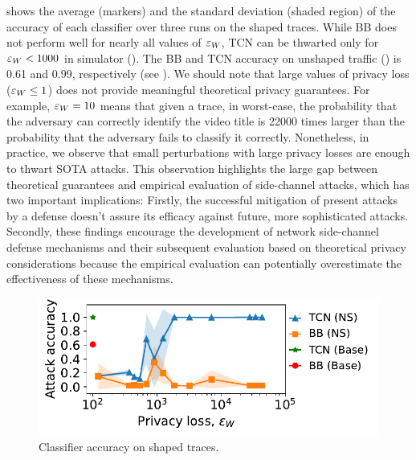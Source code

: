  shows the average (markers) and the standard deviation (shaded region) of the accuracy of each classifier over three runs on the shaped traces.
While BB does not perform well for nearly all values of $\varepsilon_{W}$, TCN can be thwarted only for $\varepsilon_{W} < 1000$ in {\sys} simulator (\ns).
The BB and TCN accuracy on unshaped traffic ({\base}) is 0.61 and 0.99, respectively (see ).
We should note that large values of privacy loss (\ie $\varepsilon_{W} \leq 1$) does not provide meaningful theoretical privacy guarantees.
For example, $\varepsilon_{W}=10$ means that given a trace, in worst-case, the probability that the adversary can correctly identify the video title is 22000 times larger than the probability that the adversary fails to classify it correctly.
Nonetheless, in practice, we observe that small perturbations with large privacy losses are enough to thwart SOTA attacks.
This observation highlights the large gap between theoretical guarantees and empirical evaluation of side-channel attacks, which has two important implications: Firstly, the successful mitigation of present attacks by a defense doesn't assure its efficacy against future, more sophisticated attacks.
Secondly, these findings encourage the development of network side-channel defense mechanisms and their subsequent evaluation based on theoretical privacy considerations because the empirical evaluation can potentially overestimate the effectiveness of these mechanisms.

\begin{figure}[t]
  \centering
  \includegraphics[width=\columnwidth]{plots/accuracy_vs_privacy_loss_video.pdf}
  \caption{Classifier accuracy on shaped traces.
  }
  \label{fig:empirical-privacy}
\end{figure}